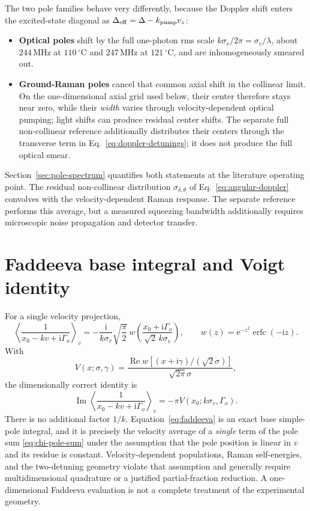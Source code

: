 \documentclass[11pt,a4paper]{article}
\newcommand{\ii}{\mathrm i}
\newcommand{\e}{\mathrm e}
\newcommand{\Rea}{\operatorname{Re}}
\newcommand{\Ima}{\operatorname{Im}}
\newcommand{\MHz}{\,\mathrm{MHz}}
\newcommand{\degC}{\,^{\circ}\mathrm C}
\begin{document}
The two pole families behave very differently, because the Doppler shift
enters the excited-state diagonal as $\Delta_{\rm eff}=\Delta-k_{\rm pump}v_z$:
\begin{itemize}
\item \textbf{Optical poles} shift by the full one-photon rms scale
$k\sigma_v/2\pi=\sigma_v/\lambda$, about $244\MHz$ at $110\degC$ and
$247\MHz$ at $121\degC$, and are inhomogeneously smeared out.
\item \textbf{Ground-Raman poles} cancel that common axial shift in the
collinear limit. On the one-dimensional axial grid used below, their center
therefore stays near zero, while their \emph{width} varies through
velocity-dependent optical pumping; light shifts can produce residual center
shifts. The separate full non-collinear reference additionally distributes
their centers through the transverse term in
Eq.~\eqref{eq:doppler-detunings}; it does not produce the full optical smear.
\end{itemize}
Section~\ref{sec:pole-spectrum} quantifies both statements at the literature
operating point. The residual non-collinear distribution
$\sigma_{\delta,\theta}$ of Eq.~\eqref{eq:angular-doppler} convolves with the
velocity-dependent Raman response. The separate reference performs this
average, but a measured squeezing bandwidth additionally requires microscopic
noise propagation and detector transfer.

\section{Faddeeva base integral and Voigt identity}

For a single velocity projection,
\begin{equation}
\left\langle\frac1{x_0-kv+\ii\Gamma_o}\right\rangle_v
=-\frac{\ii}{k\sigma_v}\sqrt{\frac{\pi}{2}}\,
w\!\left(\frac{x_0+\ii\Gamma_o}{\sqrt2\,k\sigma_v}\right),
\qquad
w(z)=\e^{-z^2}\operatorname{erfc}(-\ii z).
\label{eq:faddeeva}
\end{equation}
With
\[
V(x;\sigma,\gamma)=
\frac{\Rea w[(x+\ii\gamma)/(\sqrt2\sigma)]}
{\sqrt{2\pi}\sigma},
\]
the dimensionally correct identity is
\begin{equation}
\boxed{\;
\Ima\left\langle\frac1{x_0-kv+\ii\Gamma_o}\right\rangle_v
=-\pi V(x_0;k\sigma_v,\Gamma_o).\;}
\label{eq:voigt-correct}
\end{equation}
There is no additional factor $1/k$. Equation~\eqref{eq:faddeeva} is an exact
base simple-pole integral, and it is precisely the velocity average of a
\emph{single} term of the pole sum \eqref{eq:chi-pole-sum} under the
assumption that the pole position is linear in $v$ and its residue is
constant. Velocity-dependent populations, Raman self-energies, and the
two-detuning geometry violate that assumption and generally require
multidimensional quadrature or a justified partial-fraction reduction. A
one-dimensional Faddeeva evaluation is not a complete treatment of the
experimental geometry.
\end{document}
